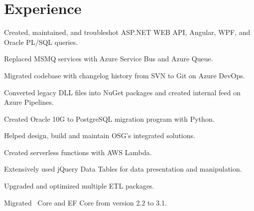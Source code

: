 \documentclass[letterpaper]{cv_12} %
\begin{document}
\hfill
%
%
\begin{minipage}[t]{0.59\textwidth}%


    \section{Experience}


    \vspace{\topsep}
    \begin{tightitemize}
        \item Created, maintained, and troubleshot ASP.NET WEB API, Angular,
        WPF, and Oracle PL/SQL queries.
        \item Replaced MSMQ services with Azure Service Bus and Azure Queue.
        \item Migrated codebase with changelog history from SVN to Git on Azure
        DevOps.
        \item Converted legacy DLL files into NuGet packages and created
        internal feed on Azure Pipelines.
        \item Created Oracle 10G to PostgreSQL migration program
        with Python.
    \end{tightitemize}

    \sectionspace%



    \begin{tightitemize}
        \item Helped design, build and maintain OSG's integrated solutions.
        \item Created serverless functions with AWS Lambda.
        \item Extensively used jQuery Data Tables for data presentation and
        manipulation.
        \item Upgraded and optimized multiple ETL packages.
        \item Migrated \dotnet\ Core and EF Core from version 2.2 to 3.1.
    \end{tightitemize}


\end{minipage}
\end{document}
